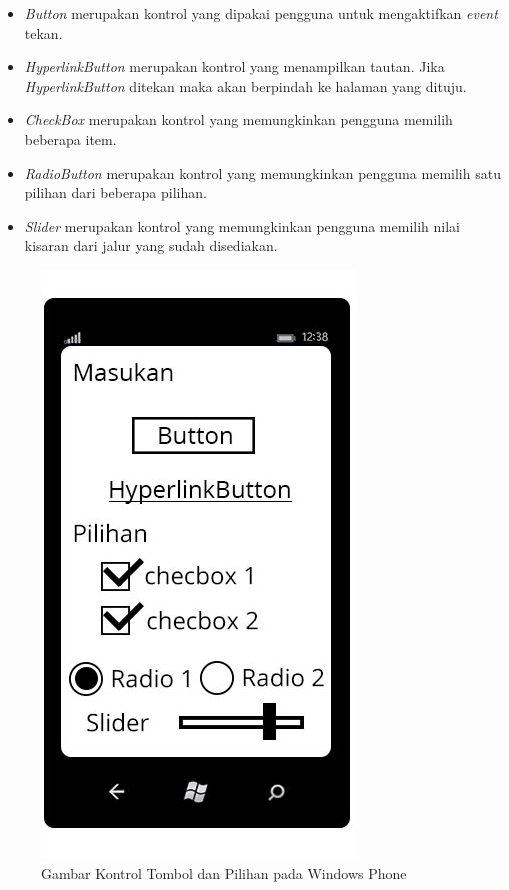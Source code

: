 \begin{itemize}
	\item \textit{Button} merupakan kontrol yang dipakai pengguna untuk mengaktifkan \textit{event} tekan.
	\item \textit{HyperlinkButton} merupakan kontrol yang menampilkan tautan. Jika \textit{HyperlinkButton} ditekan maka akan berpindah ke halaman yang dituju.	
	\item \textit{CheckBox} merupakan kontrol yang memungkinkan pengguna memilih beberapa item.
	\item \textit{RadioButton} merupakan kontrol yang memungkinkan pengguna memilih satu pilihan dari beberapa pilihan.
	\item \textit{Slider} merupakan kontrol yang memungkinkan pengguna memilih nilai kisaran dari jalur yang sudah disediakan.
\end{itemize}

\begin{figure}[h]
	\centering
		\includegraphics[scale=0.5]{Gambar/Tombol/tombol_dan_pilihan}
	\caption{Gambar Kontrol Tombol dan Pilihan pada Windows Phone}
	\label{fig:kontrol_tombol}
\end{figure}

